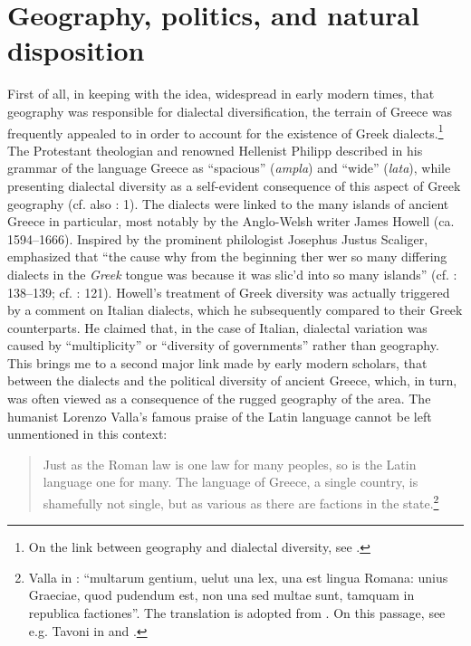 \section{Geography, politics, and natural disposition}\label{sec:7.5}


First of all, in keeping with the idea, widespread in early modern times, that geography was responsible for dialectal diversification, the terrain of Greece was frequently appealed to in order to account for the existence of Greek dialects.\footnote{On the link between geography and dialectal diversity, see \citet[]{VanRooyFcd}.} The Protestant theologian and renowned Hellenist Philipp \citet[a.1\textsc{\textsuperscript{v}}; 1520: \textsc{a.}i\textsc{\textsuperscript{v}}]{Melanchthon1518} described in his grammar of the language Greece as “spacious” (\textit{ampla}) and “wide” (\textit{lata}), while presenting dialectal diversity as a self-evident consequence of this aspect of Greek geography (cf. also \citealt{Ruland1556}: 1). The dialects were linked to the many islands of ancient Greece in particular, most notably by the Anglo-Welsh writer James Howell (ca. 1594–1666). Inspired by the prominent philologist Josephus Justus Scaliger, \citet[89]{Howell1650b} emphasized that “the cause why from the beginning ther wer so many differing dialects in the \textit{Greek} tongue was because it was slic’d into so many islands” (cf. \citealt{Howell1642}: 138–139; cf. \citealt{Scaliger1610}: 121). Howell’s treatment of Greek diversity was actually triggered by a comment on Italian dialects, which he subsequently compared to their Greek counterparts. He claimed that, in the case of Italian, dialectal variation was caused by “multiplicity” or “diversity of governments” rather than geography. This brings me to a second major link made by early modern scholars, that between the dialects and the political diversity of ancient Greece, which, in turn, was often viewed as a consequence of the rugged geography of the area. The humanist Lorenzo Valla’s famous praise of the Latin language cannot be left unmentioned in this context:

\begin{quote}
Just as the Roman law is one law for many peoples, so is the Latin language one for many. The language of Greece, a single country, is shamefully not single, but as various as there are factions in the state.\footnote{Valla in \citet[122]{Regoliosi1993}: “multarum gentium, uelut una lex, una est lingua Romana: unius Graeciae, quod pudendum est, non una sed multae sunt, tamquam in republica factiones”. The translation is adopted from \citet[10]{Trapp1990}. On this passage, see e.g. Tavoni in \citet[90 n.55]{Benvoglienti1975} and \citet[212--213]{Trovato1984}.}
\end{quote}

